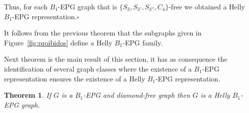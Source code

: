 \documentclass[9pt]{entcs}
\newtheorem{teo}{Theorem}[section]
\begin{document}
\begin{pf}
 Thus, for each $B_1$-EPG graph that is $\{S_{3}, S_{3'}, S_{3''}, C_{4}\}$-free we obtained a Helly $B_1$-EPG representation.$\square$
\end{pf}




It follows from the previous theorem that the subgraphs given in Figure~\ref{fig:proibidos} define a Helly $B_1$-EPG family.







Next theorem is the main result of this section, it has as consequence the identification of several graph classes where the existence of a $B_1$-EPG representation ensures the existence of a Helly $B_1$-EPG representation.


\begin{teo} \label{lem:b1DiamondFree}
 If $G$ is a $B_1$-EPG and diamond-free graph then $G$ is a Helly $B_1$-EPG graph.
 \end{teo}
\end{document}

